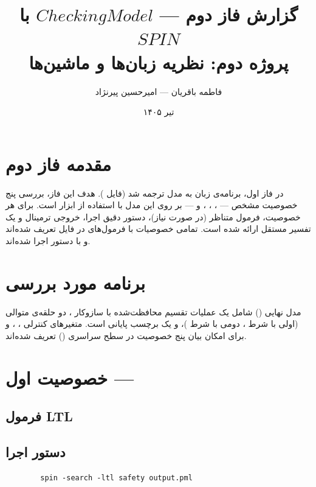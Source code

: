 \documentclass[12pt,a4paper]{article}
\title{\textbf{گزارش فاز دوم — $Checking Model$ با $SPIN$} \\[4pt]
	\large پروژه دوم: نظریه زبان‌ها و ماشین‌ها}
\author{فاطمه باقریان --- امیرحسین پیرنژاد}
\date{تیر ۱۴۰۵}
\newcommand{\ltlbox}[1]{%
	\begin{center}
		\fbox{\parbox{0.9\linewidth}{\centering $#1$}}
	\end{center}
}
\begin{document}
\maketitle
\tableofcontents
\newpage

\section{مقدمه فاز دوم}	در فاز اول، برنامه‌ی زبان  به مدل  ترجمه شد (فایل ). هدف این فاز، بررسی پنج خصوصیت مشخص —
	،
،
،
 و
	— بر روی این مدل با استفاده از ابزار  است. برای هر خصوصیت، فرمول  متناظر (در صورت نیاز)، دستور دقیق اجرا، خروجی ترمینال و یک تفسیر مستقل ارائه شده است.
		تمامی خصوصیات با فرمول‌های  در فایل  تعریف شده‌اند و با دستور  اجرا شده‌اند. 
	
\section{برنامه مورد بررسی}
مدل  نهایی () شامل یک عملیات تقسیم محافظت‌شده با سازوکار ، دو حلقه‌ی متوالی (اولی با شرط ، دومی با شرط )، و یک برچسب پایانی  است. متغیرهای کنترلی ، ،  و  برای امکان بیان پنج خصوصیت در سطح سراسری () تعریف شده‌اند.

\section{خصوصیت اول --- }

\subsection{فرمول LTL}
\ltlbox{\square\,\lnot(\mathit{divByZero})}

\subsection{دستور اجرا}
\begin{latin}
	\begin{verbatim}
		spin -search -ltl safety output.pml
	\end{verbatim}
\end{latin}
\end{document}
